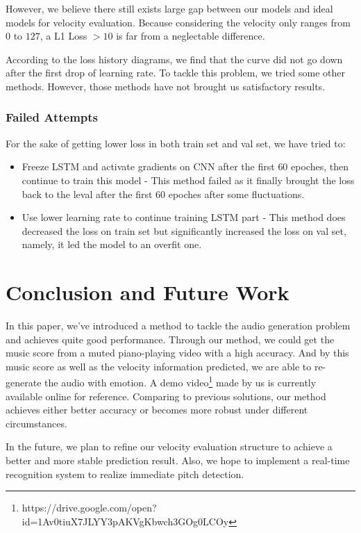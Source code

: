\documentclass[10pt,twocolumn,letterpaper]{article}
\begin{document}
However, we believe there still exists large gap between our models and ideal models for velocity evaluation. Because considering the velocity only ranges from \(0\) to \(127\), a L1 Loss \(> 10\) is far from a neglectable difference.

According to the loss history diagrams, we find that the curve did not go down after the first drop of learning rate. To tackle this problem, we tried some other methods. However, those methods have not brought us satisfactory results.

\subsubsection{Failed Attempts}

For the sake of getting lower loss in both train set and val set, we have tried to:

\begin{itemize}

\item Freeze LSTM and activate gradients on CNN after the first \(60\) epoches, then continue to train this model - This method failed as it finally brought the loss back to the leval after the first \(60\) epoches after some fluctuations.

\item Use lower learning rate to continue training LSTM part - This method does decreased the loss on train set but significantly increased the loss on val set, namely, it led the model to an overfit one. 

  \end{itemize}

\section{Conclusion and Future Work}

In this paper, we've introduced a method to tackle the audio generation problem and achieves quite good performance.
Through our method, we could get the music score from a muted piano-playing video with a high accuracy.
And by this music score as well as the velocity information predicted, we are able to re-generate the audio with emotion.
A demo video\footnote{https://drive.google.com/open?id=1Av0tiuX7JLYY3pAKVgKbwch3GOg0LCOy} made by us is currently available online for reference.
Comparing to previous solutions, our method achieves either better accuracy or becomes more robust under different circumstances.



In the future, we plan to refine our velocity evaluation structure to achieve a better and more stable prediction result.
Also, we hope to implement a real-time recognition system to realize immediate pitch detection.


{\small


}
\end{document}
